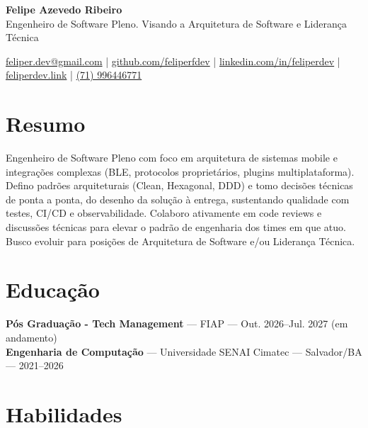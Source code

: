 \documentclass[11pt,a4paper]{article}
\begin{document}
{\LARGE\bfseries Felipe Azevedo Ribeiro}\\[2pt]
{\normalsize Engenheiro de Software Pleno. Visando a Arquitetura de Software e Lideran\c{c}a T\'ecnica}

\vspace{0.3cm}

\href{mailto:feliper.dev@gmail.com}{feliper.dev@gmail.com} |
\href{https://github.com/feliperfdev}{github.com/feliperfdev} |
\href{https://www.linkedin.com/in/feliperdev}{linkedin.com/in/feliperdev} |
\href{https://www.feliperdev.link}{feliperdev.link} |
\href{tel:+5571996446771}{(71) 996446771}

\section*{Resumo}

Engenheiro de Software Pleno com foco em arquitetura de sistemas mobile e integrações complexas (BLE, protocolos proprietários, plugins multiplataforma). Defino padrões arquiteturais (Clean, Hexagonal, DDD) e tomo decisões técnicas de ponta a ponta, do desenho da solução à entrega, sustentando qualidade com testes, CI/CD e observabilidade. Colaboro ativamente em code reviews e discussões técnicas para elevar o padrão de engenharia dos times em que atuo. Busco evoluir para posições de Arquitetura de Software e/ou Liderança Técnica.

\section*{Educação}

\textbf{Pós Graduação - Tech Management} — FIAP — Out. 2026–Jul. 2027 (em andamento)\\
\textbf{Engenharia de Computação} — Universidade SENAI Cimatec — Salvador/BA — 2021–2026

\section*{Habilidades}
\end{document}
